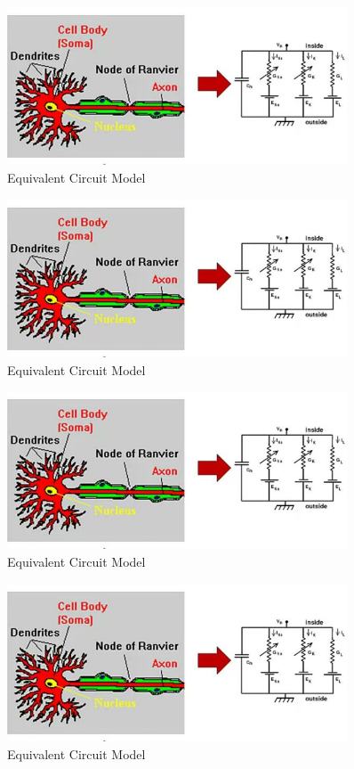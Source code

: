 \documentclass[]{article}
\begin{document}
\begin{figure}[H]
	\caption[Equivalent Circuit Model]{Equivalent Circuit Model}
	\includegraphics[width=0.9\textwidth]{equivalent-circuit-model}
\end{figure}

\begin{figure}[H]
	\caption[Equivalent Circuit Model]{Equivalent Circuit Model}
	\includegraphics[width=0.9\textwidth]{equivalent-circuit-model}
\end{figure}

\begin{figure}[H]
	\caption[Equivalent Circuit Model]{Equivalent Circuit Model}
	\includegraphics[width=0.9\textwidth]{equivalent-circuit-model}
\end{figure}

\begin{figure}[H]
	\caption[Equivalent Circuit Model]{Equivalent Circuit Model}
	\includegraphics[width=0.9\textwidth]{equivalent-circuit-model}
\end{figure}
\end{document}
